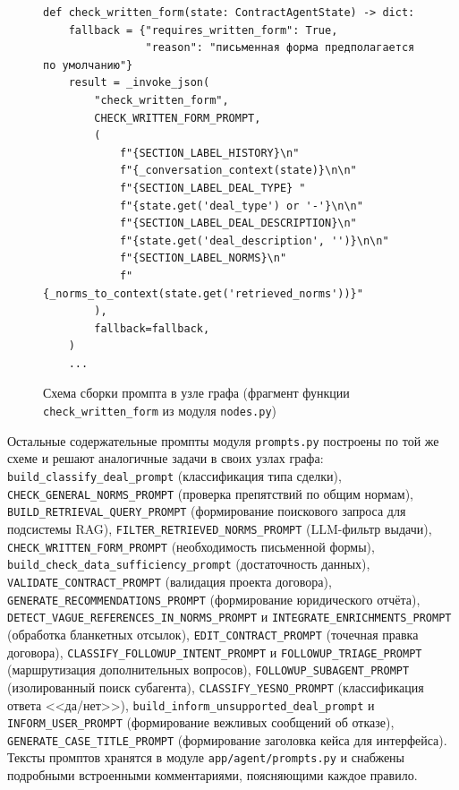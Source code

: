 \begin{figure}[H]
\begin{lstlisting}[style=promptstyle, language={}]
def check_written_form(state: ContractAgentState) -> dict:
    fallback = {"requires_written_form": True,
                "reason": "письменная форма предполагается по умолчанию"}
    result = _invoke_json(
        "check_written_form",
        CHECK_WRITTEN_FORM_PROMPT,
        (
            f"{SECTION_LABEL_HISTORY}\n"
            f"{_conversation_context(state)}\n\n"
            f"{SECTION_LABEL_DEAL_TYPE} "
            f"{state.get('deal_type') or '-'}\n\n"
            f"{SECTION_LABEL_DEAL_DESCRIPTION}\n"
            f"{state.get('deal_description', '')}\n\n"
            f"{SECTION_LABEL_NORMS}\n"
            f"{_norms_to_context(state.get('retrieved_norms'))}"
        ),
        fallback=fallback,
    )
    ...
\end{lstlisting}
\caption{Схема сборки промпта в узле графа (фрагмент функции \texttt{check\_written\_form} из модуля \texttt{nodes.py})}
\label{src:prompt-assembly}
\end{figure}

Остальные содержательные промпты модуля \texttt{prompts.py} построены по той же схеме и решают аналогичные задачи в своих узлах графа: \texttt{build\_classify\_deal\_prompt} (классификация типа сделки), \texttt{CHECK\_GENERAL\_NORMS\_PROMPT} (проверка препятствий по общим нормам), \texttt{BUILD\_RETRIEVAL\_QUERY\_PROMPT} (формирование поискового запроса для подсистемы RAG), \texttt{FILTER\_RETRIEVED\_NORMS\_PROMPT} (LLM-фильтр выдачи), \texttt{CHECK\_WRITTEN\_FORM\_PROMPT} (необходимость письменной формы), \texttt{build\_check\_data\_sufficiency\_prompt} (достаточность данных), \texttt{VALIDATE\_CONTRACT\_PROMPT} (валидация проекта договора), \texttt{GENERATE\_RECOMMENDATIONS\_PROMPT} (формирование юридического отчёта), \texttt{DETECT\_VAGUE\_REFERENCES\_IN\_NORMS\_PROMPT} и \texttt{INTEGRATE\_ENRICHMENTS\_PROMPT} (обработка бланкетных отсылок), \texttt{EDIT\_CONTRACT\_PROMPT} (точечная правка договора), \texttt{CLASSIFY\_FOLLOWUP\_INTENT\_PROMPT} и \texttt{FOLLOWUP\_TRIAGE\_PROMPT} (маршрутизация дополнительных вопросов), \texttt{FOLLOWUP\_SUBAGENT\_PROMPT} (изолированный поиск субагента), \texttt{CLASSIFY\_YESNO\_PROMPT} (классификация ответа <<да/нет>>), \texttt{build\_inform\_unsupported\_deal\_prompt} и \texttt{INFORM\_USER\_PROMPT} (формирование вежливых сообщений об отказе), \texttt{GENERATE\_CASE\_TITLE\_PROMPT} (формирование заголовка кейса для интерфейса). Тексты промптов хранятся в модуле \texttt{app/agent/prompts.py} и снабжены подробными встроенными комментариями, поясняющими каждое правило.
